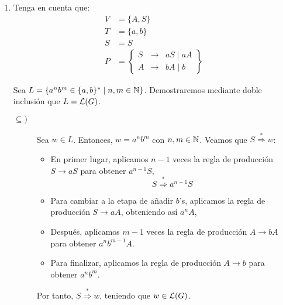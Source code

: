 \begin{ejercicio}
\begin{enumerate}
        \item Tenga en cuenta que:
        \begin{align*}
            V &= \{A,S\} \\
            T &= \{a,b\} \\
            S &= S \\
            P &= \left\{
                \begin{array}{rcl}
                    S &\rightarrow & aS \mid aA \\
                    A &\rightarrow & bA \mid b
                \end{array}
            \right\}
        \end{align*}

        Sea $L=\{a^nb^m \in \{a,b\}^\ast \mid n, m \in \mathbb{N}\}$. Demostraremos mediante doble inclusión que $L=\mathcal{L}(G)$.
        \begin{description}
            \item[$\subseteq)$] Sea $w\in L$. Entonces, $w=a^nb^m$ con $n,m\in \mathbb{N}$. Veamos que
            $S \stackrel{\ast}{\Longrightarrow} w$:
            \begin{itemize}
                \item En primer lugar, aplicamos $n-1$ veces la regla de producción $S \rightarrow aS$ para obtener $a^{n-1}S$,
                \begin{equation*}
                    S \stackrel{\ast}{\Longrightarrow} a^{n-1}S
                \end{equation*}

                \item Para cambiar a la etapa de añadir $b$'s, aplicamos la regla de producción $S \rightarrow aA$, obteniendo así $a^{n}A$,
                \item Después, aplicamos $m-1$ veces la regla de producción $A \rightarrow bA$ para obtener $a^nb^{m-1}A$.
                \item Para finalizar, aplicamos la regla de producción $A \rightarrow b$ para obtener $a^nb^m$.
            \end{itemize}
            Por tanto, $S \stackrel{\ast}{\Longrightarrow} w$, teniendo que $w\in \mathcal{L}(G)$.


\end{description}
\end{enumerate}
\end{ejercicio}
